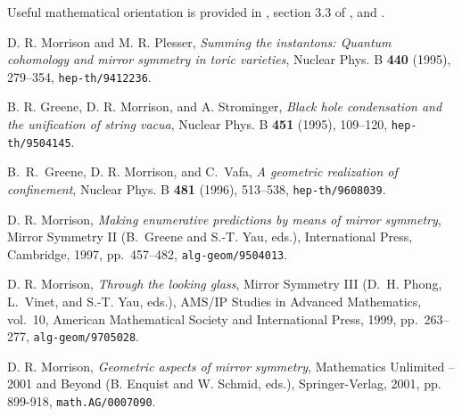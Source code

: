 \documentclass[12pt]{article}
\begin{document}
Useful mathematical orientation is provided in \cite{predictions},
section 3.3 of \cite{looking}, and \cite{aspects}.

\begin{thebibliography}{10}

{D. R. Morrison and M. R. Plesser}, {\em Summing the instantons: Quantum cohomology and
  mirror symmetry in toric varieties}, Nuclear Phys. B {\bf 440} (1995),
  279--354, {\tt hep-th/9412236}.


B. R. Greene, D. R. Morrison, and A. Strominger, {\em Black hole condensation and the
  unification of string vacua}, Nuclear Phys. B {\bf 451} (1995), 109--120,
  {\tt hep-th/9504145}.

B.~R.~Greene, D. R. Morrison, and C.~Vafa, {\em A geometric realization of confinement},
  Nuclear Phys. B {\bf 481} (1996), 513--538, {\tt hep-th/9608039}.




D. R. Morrison, {\em Making enumerative predictions by means of mirror symmetry}, Mirror
  Symmetry {II} (B.~Greene and S.-T. Yau, eds.), International Press,
  Cambridge, 1997, pp.~457--482, {\tt alg-geom/9504013}.

D. R. Morrison, {\em Through the looking glass}, Mirror Symmetry {III} (D.~H. Phong, L.~Vinet,
  and S.-T. Yau, eds.), AMS/IP Studies in Advanced Mathematics, vol.~10,
  American Mathematical Society and International Press, 1999, pp.~263--277,
  {\tt alg-geom/9705028}.

D. R. Morrison, {\em
Geometric aspects of mirror symmetry}, Mathematics Unlimited -- 2001 and Beyond (B. Enquist and W. Schmid, eds.), Springer-Verlag, 2001, pp. 899-918, {\tt math.AG/0007090}.

\end{thebibliography}
\end{document}
